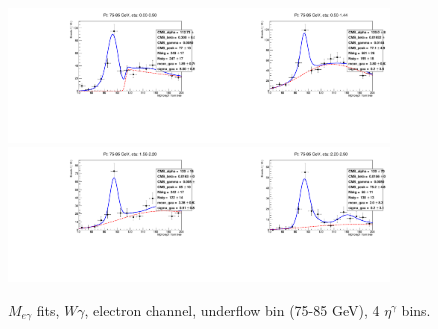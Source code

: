 \begin{figure}[htb]
  \begin{center}
   \includegraphics[width=0.45\textwidth]{../figs/figs_v11/ELECTRON_WGamma/EtoGammaFits/sa_hZmass_h_Data_EtoGamma_Enr_BARREL_pt75to85_ieta0_noWMtCut.pdf}\includegraphics[width=0.45\textwidth]{../figs/figs_v11/ELECTRON_WGamma/EtoGammaFits/sa_hZmass_h_Data_EtoGamma_Enr_BARREL_pt75to85_ieta1_noWMtCut.pdf}\\
   \includegraphics[width=0.45\textwidth]{../figs/figs_v11/ELECTRON_WGamma/EtoGammaFits/sa_hZmass_h_Data_EtoGamma_Enr_ENDCAP_pt75to85_ieta0_noWMtCut.pdf}\includegraphics[width=0.45\textwidth]{../figs/figs_v11/ELECTRON_WGamma/EtoGammaFits/sa_hZmass_h_Data_EtoGamma_Enr_ENDCAP_pt75to85_ieta1_noWMtCut.pdf}\\
  \label{fig:etogFits_75to85}
  \caption{$M_{e\gamma}$ fits, $W\gamma$, electron channel, underflow bin (75-85 GeV), 4 $\eta^{\gamma}$ bins.}
  \end{center}
\end{figure}

